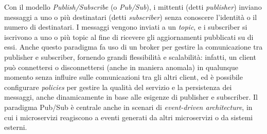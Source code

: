 Con il modello \emph{Publish/Subscribe} (o \emph{Pub/Sub}), i mittenti (detti \emph{publisher}) inviano messaggi a uno o più destinatari (detti \emph{subscriber}) senza conoscere l'identità o il numero di destinatari. I messaggi vengono inviati a un \emph{topic}, e i subscriber si iscrivono a uno o più topic al fine di ricevere gli aggiornamenti pubblicati su di essi. Anche questo paradigma fa uso di un broker per gestire la comunicazione tra publisher e subscriber, fornendo grandi flessibilità e scalabilità: infatti, un client può connettersi o disconnettersi (anche in maniera anomala) in qualunque momento senza influire sulle comunicazioni tra gli altri client, ed è possibile configurare \emph{policies} per gestire la qualità del servizio e la persistenza dei messaggi, anche dinamicamente in base alle esigenze di publisher e subscriber.
Il paradigma Pub/Sub è centrale anche in scenari di \emph{event-driven architecture}, in cui i microservizi reagiscono a eventi generati da altri microservizi o da sistemi esterni.





